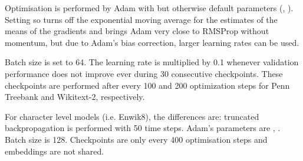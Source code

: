 \documentclass[letter]{article} \usepackage{iclr2018_conference,times}
\newcommand{\ptb}{Penn Treebank\xspace}
\newcommand{\wikitexttwo}{Wikitext-2\xspace}
\newcommand{\enwik}{Enwik8\xspace}
\begin{document}
Optimisation is performed by Adam \citep{kingma2014adam} with
 but otherwise default parameters (,
). Setting  so turns off the exponential
moving average for the estimates of the means of the gradients and
brings Adam very close to RMSProp without momentum, but due to Adam's
bias correction, larger learning rates can be used.

Batch size is set to 64. The learning rate is multiplied by 0.1
whenever validation performance does not improve ever during 30
consecutive checkpoints. These checkpoints are performed after every
100 and 200 optimization steps for \ptb and \wikitexttwo,
respectively.

For character level models (i.e. \enwik), the differences are:
truncated backpropagation is performed with 50 time steps. Adam's
parameters are , . Batch size is 128.
Checkpoints are only every 400 optimisation steps and embeddings are
not shared.
\end{document}
